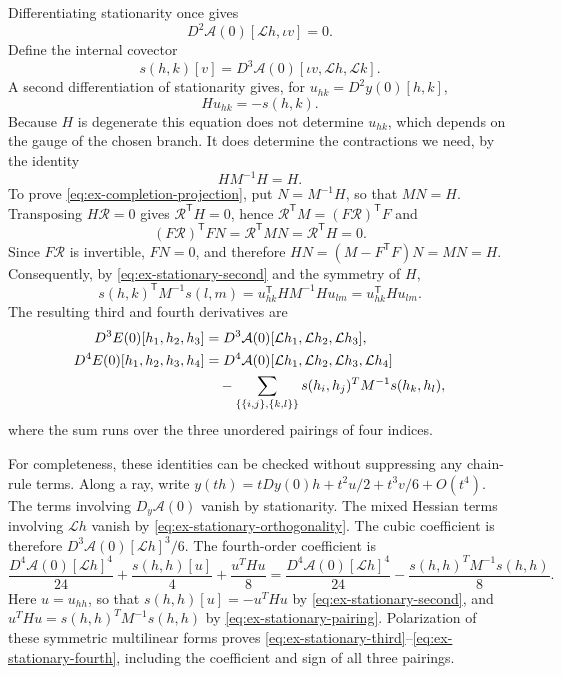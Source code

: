 Differentiating stationarity once gives
\begin{equation}\label{eq:ex-stationary-orthogonality}
             D^2\mathcal A(0)[\mathcal Lh,\iota v]=0.
\end{equation}
Define the internal covector
\[
 s(h,k)[v]=D^3\mathcal A(0)[\iota v,\mathcal Lh,\mathcal Lk].
\]
A second differentiation of stationarity gives, for
$u_{hk}=D^2y(0)[h,k]$,
\begin{equation}\label{eq:ex-stationary-second}
                 Hu_{hk}=-s(h,k).
\end{equation}
Because $H$ is degenerate this equation does not determine $u_{hk}$,
which depends on the gauge of the chosen branch. It does determine the
contractions we need, by the identity
\begin{equation}\label{eq:ex-completion-projection}
                 HM^{-1}H=H.
\end{equation}
To prove \eqref{eq:ex-completion-projection}, put $N=M^{-1}H$, so that
$MN=H$. Transposing $H\mathcal R=0$ gives $\mathcal R^{\mathsf T}H=0$,
hence $\mathcal R^{\mathsf T}M=(F\mathcal R)^{\mathsf T}F$ and
\[
 (F\mathcal R)^{\mathsf T}FN=\mathcal R^{\mathsf T}MN
                             =\mathcal R^{\mathsf T}H=0.
\]
Since $F\mathcal R$ is invertible, $FN=0$, and therefore
$HN=(M-F^{\mathsf T}F)N=MN=H$. Consequently, by
\eqref{eq:ex-stationary-second} and the symmetry of $H$,
\begin{equation}\label{eq:ex-stationary-pairing}
 s(h,k)^{\mathsf T}M^{-1}s(l,m)=u_{hk}^{\mathsf T}HM^{-1}Hu_{lm}
                              =u_{hk}^{\mathsf T}Hu_{lm}.
\end{equation}
The resulting third and fourth derivatives are
\begin{align}
 D^3E(0)[h_1,h_2,h_3]
   &=D^3\mathcal A(0)[\mathcal Lh_1,\mathcal Lh_2,\mathcal Lh_3],
       \label{eq:ex-stationary-third}\\
 D^4E(0)[h_1,h_2,h_3,h_4]
   &=D^4\mathcal A(0)[\mathcal Lh_1,\mathcal Lh_2,
                       \mathcal Lh_3,\mathcal Lh_4]\notag\\
   &\quad-\sum_{\{\{i,j\},\{k,l\}\}}
                      s(h_i,h_j)^TM^{-1}s(h_k,h_l),
       \label{eq:ex-stationary-fourth}
\end{align}
where the sum runs over the three unordered pairings of four indices.

For completeness, these identities can be checked without suppressing
any chain-rule terms. Along a ray, write
$y(th)=tDy(0)h+t^2u/2+t^3v/6+O(t^4)$.
The terms involving $D_y\mathcal A(0)$ vanish by stationarity. The
mixed Hessian terms involving $\mathcal Lh$ vanish by
\eqref{eq:ex-stationary-orthogonality}. The cubic coefficient is therefore
$D^3\mathcal A(0)[\mathcal Lh]^3/6$. The fourth-order coefficient is
\[
 \frac{D^4\mathcal A(0)[\mathcal Lh]^4}{24}
       +\frac{s(h,h)[u]}4+\frac{u^THu}{8}
 =\frac{D^4\mathcal A(0)[\mathcal Lh]^4}{24}
       -\frac{s(h,h)^TM^{-1}s(h,h)}8.
\]
Here $u=u_{hh}$, so that $s(h,h)[u]=-u^THu$ by
\eqref{eq:ex-stationary-second}, and
$u^THu=s(h,h)^TM^{-1}s(h,h)$ by \eqref{eq:ex-stationary-pairing}.
Polarization of these symmetric multilinear
forms proves \eqref{eq:ex-stationary-third}--\eqref{eq:ex-stationary-fourth},
including the coefficient and sign of all three pairings.

